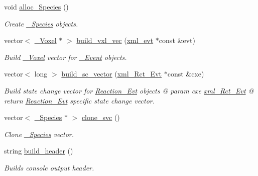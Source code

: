 \begin{DoxyCompactItemize}
void \hyperlink{classnw_1_1_standard___ipt_ac234f7433af26ad614e3f43088f13e48}{alloc\+\_\+\+Species} ()
\begin{DoxyCompactList}\small\item\em Create \hyperlink{classnw_1_1___species}{\+\_\+\+Species} objects. \end{DoxyCompactList}\item 
vector$<$ \hyperlink{classnw_1_1___voxel}{\+\_\+\+Voxel} $\ast$ $>$ \hyperlink{classnw_1_1_standard___ipt_a834bc59d1c945553aad59de7b23e019f}{build\+\_\+vxl\+\_\+vec} (\hyperlink{structnw_1_1_standard___ipt_1_1xml__evt}{xml\+\_\+evt} $\ast$const \&evt)
\begin{DoxyCompactList}\small\item\em Build \hyperlink{classnw_1_1___voxel}{\+\_\+\+Voxel} vector for \hyperlink{classnw_1_1___event}{\+\_\+\+Event} objects. \end{DoxyCompactList}\item 
vector$<$ long $>$ \hyperlink{classnw_1_1_standard___ipt_a5623430707739fdabf4d99599e6444a2}{build\+\_\+sc\+\_\+vector} (\hyperlink{structnw_1_1_standard___ipt_1_1xml___rct___evt}{xml\+\_\+\+Rct\+\_\+\+Evt} $\ast$const \&cxe)
\begin{DoxyCompactList}\small\item\em Build state change vector for \hyperlink{classnw_1_1_reaction___evt}{Reaction\+\_\+\+Evt} objects @ param cxe \hyperlink{structnw_1_1_standard___ipt_1_1xml___rct___evt}{xml\+\_\+\+Rct\+\_\+\+Evt} @ return \hyperlink{classnw_1_1_reaction___evt}{Reaction\+\_\+\+Evt} specific state change vector. \end{DoxyCompactList}\item 
vector$<$ \hyperlink{classnw_1_1___species}{\+\_\+\+Species} $\ast$ $>$ \hyperlink{classnw_1_1_standard___ipt_ae75407ca95fe5c6e0e2b48a892c0dcdb}{clone\+\_\+svc} ()
\begin{DoxyCompactList}\small\item\em Clone \hyperlink{classnw_1_1___species}{\+\_\+\+Species} vector. \end{DoxyCompactList}\item 
string \hyperlink{classnw_1_1_standard___ipt_a94a28b548fd1ae6dca50c8fb88d690bb}{build\+\_\+header} ()
\begin{DoxyCompactList}\small\item\em Builds console output header. \end{DoxyCompactList}\end{DoxyCompactItemize}
